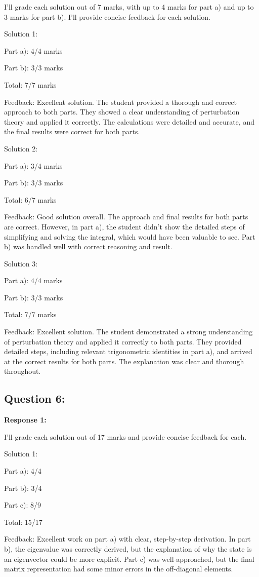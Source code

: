 \documentclass[a4paper,11pt]{article}
\begin{document}
I'll grade each solution out of 7 marks, with up to 4 marks for part a) and up to 3 marks for part b). I'll provide concise feedback for each solution.

Solution 1:

Part a): 4/4 marks

Part b): 3/3 marks

Total: 7/7 marks

Feedback: Excellent solution. The student provided a thorough and correct approach to both parts. They showed a clear understanding of perturbation theory and applied it correctly. The calculations were detailed and accurate, and the final results were correct for both parts.

Solution 2:

Part a): 3/4 marks

Part b): 3/3 marks

Total: 6/7 marks

Feedback: Good solution overall. The approach and final results for both parts are correct. However, in part a), the student didn't show the detailed steps of simplifying and solving the integral, which would have been valuable to see. Part b) was handled well with correct reasoning and result.

Solution 3:

Part a): 4/4 marks

Part b): 3/3 marks

Total: 7/7 marks

Feedback: Excellent solution. The student demonstrated a strong understanding of perturbation theory and applied it correctly to both parts. They provided detailed steps, including relevant trigonometric identities in part a), and arrived at the correct results for both parts. The explanation was clear and thorough throughout.

\subsection*{Question 6:}

\textbf{Response 1:}

I'll grade each solution out of 17 marks and provide concise feedback for each.

Solution 1:

Part a): 4/4

Part b): 3/4

Part c): 8/9

Total: 15/17

Feedback: Excellent work on part a) with clear, step-by-step derivation. In part b), the eigenvalue was correctly derived, but the explanation of why the state is an eigenvector could be more explicit. Part c) was well-approached, but the final matrix representation had some minor errors in the off-diagonal elements.
\end{document}

